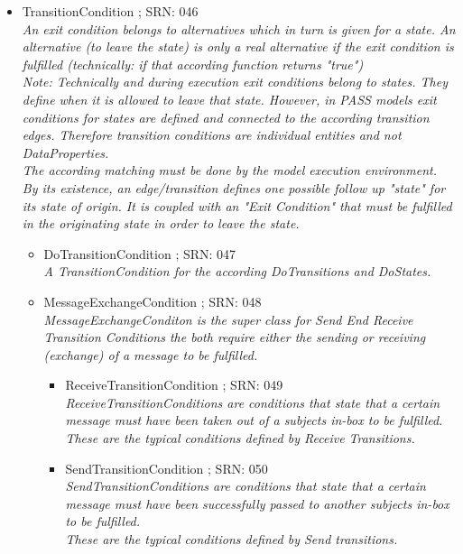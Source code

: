 \begin{itemize}
\begin{itemize}
\begin{itemize}
\begin{itemize}
\begin{itemize}
			\end{itemize}
			\item TransitionCondition ; SRN: 046 \\ \textit{An exit condition belongs to alternatives which in turn is given for a state. An alternative (to leave the state) is only a real alternative if the exit condition is fulfilled (technically: if that according function returns "true") \\Note: Technically and during execution exit conditions belong to states. They define when it is allowed to leave that state. However, in PASS models exit conditions for states are defined and connected to the according transition edges. Therefore transition conditions are individual entities and not DataProperties.\\ The according matching must be done by the model execution environment.\\ By its existence, an edge/transition defines one possible follow up "state" for its state of origin. It is coupled with an "Exit Condition" that must be fulfilled in the originating state in order to leave the state.}
			\begin{itemize}
				\item DoTransitionCondition ; SRN: 047 \\ \textit{A TransitionCondition for the according DoTransitions and DoStates. }
				\item MessageExchangeCondition ; SRN: 048 \\ \textit{MessageExchangeConditon is the super class for Send End Receive Transition Conditions the both require either the sending or receiving (exchange) of a message to be fulfilled.}
				\begin{itemize}
					\item ReceiveTransitionCondition ; SRN: 049 \\ \textit{ReceiveTransitionConditions are conditions that state that a certain message must have been taken out of a subjects in-box to be fulfilled.\\ These are the typical conditions defined by Receive Transitions.}
					\item SendTransitionCondition ; SRN: 050 \\ \textit{SendTransitionConditions are conditions that state that a certain message must have been successfully passed to another subjects in-box to be fulfilled.\\ These are the typical conditions defined by Send transitions.}
				\end {itemize}

\end{itemize}
\end{itemize}
\end{itemize}
\end{itemize}
\end{itemize}
